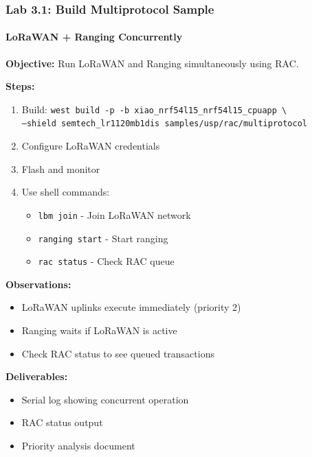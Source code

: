 \documentclass{beamer}
\begin{document}
\begin{frame}
\frametitle{Lab 3.1: Build Multiprotocol Sample}
\framesubtitle{LoRaWAN + Ranging Concurrently}

\textbf{Objective:} Run LoRaWAN and Ranging simultaneously using RAC.

\textbf{Steps:}
\begin{enumerate}
    \item Build: \texttt{west build -p -b xiao\_nrf54l15\_nrf54l15\_cpuapp \textbackslash\\
          --shield semtech\_lr1120mb1dis samples/usp/rac/multiprotocol}
    \item Configure LoRaWAN credentials
    \item Flash and monitor
    \item Use shell commands:
    \begin{itemize}
        \item \texttt{lbm join} - Join LoRaWAN network
        \item \texttt{ranging start} - Start ranging
        \item \texttt{rac status} - Check RAC queue
    \end{itemize}
\end{enumerate}

\textbf{Observations:}
\begin{itemize}
    \item LoRaWAN uplinks execute immediately (priority 2)
    \item Ranging waits if LoRaWAN is active
    \item Check RAC status to see queued transactions
\end{itemize}

\textbf{Deliverables:}
\begin{itemize}
    \item Serial log showing concurrent operation
    \item RAC status output
    \item Priority analysis document
\end{itemize}
\end{frame}
\end{document}
